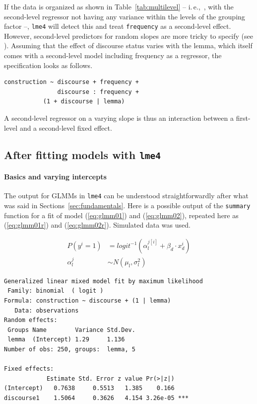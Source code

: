 \documentclass[a4paper,12pt]{article}
\newcommand{\ie}{i.\,e.,\ }
\begin{document}
If the data is organized as shown in Table~\ref{tab:multilevel} -- \ie, with the second-level regressor not having any variance within the levels of the grouping factor --, \texttt{lme4} will detect this and treat \texttt{frequency} as a second-level effect.
However, second-level predictors for random slopes are more tricky to specify (see \citealt[280-282]{GelmanHill2006}).
Assuming that the effect of discourse status varies with the lemma, which itself comes with a second-level model including frequency as a regressor, the specification looks as follows.

\vspace{0.5\baselineskip}

\begin{lstlisting}
construction ~ discourse + frequency +
               discourse : frequency +
	       (1 + discourse | lemma)
\end{lstlisting}

A second-level regressor on a varying slope is thus an interaction between a first-level and a second-level fixed effect.

\subsection{After fitting models with \texttt{lme4}}
\label{sec:afterfittingmodelswithlme4}

\paragraph{Basics and varying intercepts}

The output for GLMMs in \texttt{lme4} can be understood straightforwardly after what was said in Sections~\ref{sec:fundamentals}.
Here is a possible output of the \texttt{summary} function for a fit of model (\ref{eq:glmm01}) and (\ref{eq:glmm02}), repeated here as (\ref{eq:glmm01r}) and (\ref{eq:glmm02r}).
Simulated data was used.

\begin{align}
  P(y^i=1) & = logit^{-1}(\alpha_{l}^{j[i]}+\beta_d\cdot x_d^i)
  \label{eq:glmm01r} \\
  \alpha_l^j & \sim N(\mu_l,\sigma_l^2)
  \label{eq:glmm02r}
\end{align}

\vspace{0.5\baselineskip}

\begin{lstlisting}
Generalized linear mixed model fit by maximum likelihood 
 Family: binomial  ( logit )
Formula: construction ~ discourse + (1 | lemma)
   Data: observations
Random effects:
 Groups Name        Variance Std.Dev.
 lemma  (Intercept) 1.29     1.136   
Number of obs: 250, groups:  lemma, 5

Fixed effects:
            Estimate Std. Error z value Pr(>|z|)    
(Intercept)   0.7638     0.5513   1.385    0.166    
discourse1    1.5064     0.3626   4.154 3.26e-05 ***
\end{lstlisting}
\end{document}
